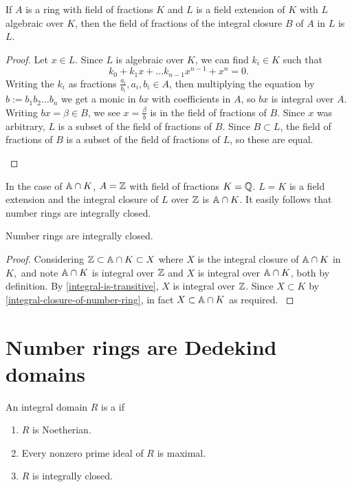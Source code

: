 \begin{lemma}\label{integral-closure-of-number-ring}
If $A$ is a ring with field of fractions $K$ and $L$ is a field extension of $K$ with $L$ algebraic over $K$, then the field of fractions of the integral closure $B$ of $A$ in $L$ is $L$.
\end{lemma}
\begin{proof}
Let $x\in L$. Since $L$ is algebraic over $K$, we can find $k_i\in K$ such that
$$k_0+k_1x+\dots k_{n-1}x^{n-1}+x^n=0.$$
Writing the $k_i$ as fractions $\frac{a_i}{b_i}, a_i,b_i\in A$, then multiplying the equation by $b:=b_1b_2\dots b_n$ we get a monic in $bx$ with coefficients in $A$, so $bx$ is integral over $A$. Writing $bx=\beta \in B$, we see $x=\frac{\beta}{b}$ is in the field of fractions of $B$. Since $x$ was arbitrary, $L$ is a subset of the field of fractions of $B$. Since $B\subset L$, the field of fractions of $B$ is a subset of the field of fractions of $L$, so these are equal.

\cite{Wright}
\end{proof}

In the case of $\mathbb{A}\cap K$, $A=\mathbb{Z}$ with field of fractions $K=\mathbb{Q}$. $L=K$ is a field extension and the integral closure of $L$ over $\mathbb{Z}$ is $\mathbb{A}\cap K$. It easily follows that number rings are integrally closed.

\begin{prop}\label{number-ring-int-closed}
Number rings are integrally closed.
\end{prop}
\begin{proof}
Considering $\mathbb{Z}\subset \mathbb{A}\cap K \subset X$ where $X$ is the integral closure of $\mathbb{A}\cap K$ in $K,$ and note $\mathbb{A}\cap K$ is integral over $\mathbb{Z}$ and $X$ is integral over $\mathbb{A}\cap K$, both by definition. By \cref{integral-is-transitive}, $X$ is integral over $\mathbb{Z}$. Since $X\subset K$ by \cref{integral-closure-of-number-ring}, in fact $X\subset \mathbb{A}\cap K$ as required.
\cite{Wright}
\end{proof}

\section{Number rings are Dedekind domains}

\begin{definition}
An integral domain $R$ is a  if
\begin{enumerate}[(1)]
    \item $R$ is Noetherian.
    \item Every nonzero prime ideal of $R$ is maximal.
    \item $R$ is integrally closed.
\end{enumerate}
\end{definition}

